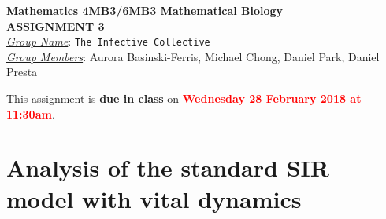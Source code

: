\documentclass[12pt]{article}\usepackage[]{graphicx}\usepackage[]{color}
\begin{document}
\begin{center}
{\bf Mathematics 4MB3/6MB3 Mathematical Biology\\
 ASSIGNMENT 3}\\
\medskip
\underline{\emph{Group Name}}: \texttt{{\color{blue}The Infective Collective}}\\
\medskip
\underline{\emph{Group Members}}: {\color{blue}Aurora Basinski-Ferris, Michael Chong, Daniel Park, Daniel Presta}
\end{center}

\bigskip
\noindent
This assignment is {\bfseries\color{red} due in class} on \textcolor{red}{\bf Wednesday 28 February 2018 at 11:30am}.

\bigskip

\section*{Analysis of the standard SIR model with vital dynamics}

\SIRintro
\end{document}
